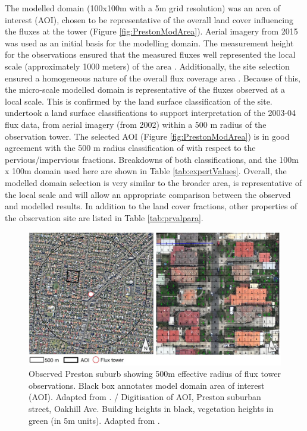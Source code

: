 \documentclass[final,3p,times,authoryear]{elsarticle}
\begin{document}
The modelled domain (100x100m with a 5m grid resolution) was an area of interest (AOI), chosen to be representative of the overall land cover influencing the fluxes at the tower (Figure \ref{fig:PrestonModArea}). Aerial imagery from 2015 \citep{GooglePreston2015} was used as an initial basis for the modelling domain. The measurement height for the observations ensured that the measured fluxes well represented the local scale (approximately 1000 meters) of the area \citep{Coutts2007}. Additionally, the site selection ensured a homogeneous nature of the overall flux coverage area \citep{Schmid1994}. Because of this, the micro-scale modelled domain is representative of the fluxes observed at a local scale. This is confirmed by the land surface classification of the site. \cite{Coutts2007} undertook a land surface classifications to support interpretation of the 2003-04 flux data, from aerial imagery (from 2002) within a 500 m radius of the observation tower. The selected AOI (Figure \ref{fig:PrestonModArea}) is in good agreement with the 500 m radius classification of \cite{Coutts2007} with respect to the pervious/impervious fractions. Breakdowns of both classifications, and the 100m x 100m domain used here are shown in Table \ref{tab:expertValues}. Overall, the modelled domain selection is very similar to the broader area, is representative of the local scale and will allow an appropriate comparison between the observed and modelled results. In addition to the land cover fractions, other properties of the observation site are listed in Table \ref{tab:prvalpara}.

\begin{figure}[!htbp]
\includegraphics[trim = 0mm 0mm 0mm 0mm, clip, scale=1.00]{images/PrestonModelledArea.png} 
\caption{Observed Preston suburb showing 500m effective radius of flux tower observations. Black box annotates model domain area of interest (AOI). Adapted from \cite{GooglePreston2015}.\label{fig:PrestonModArea} / Digitisation of AOI, Preston suburban street, Oakhill Ave. Building heights in black, vegetation heights in green (in 5m units). Adapted from \cite{Nearmap2015}.\label{fig:PrestonDigitization}}      
\end{figure}
\end{document}
